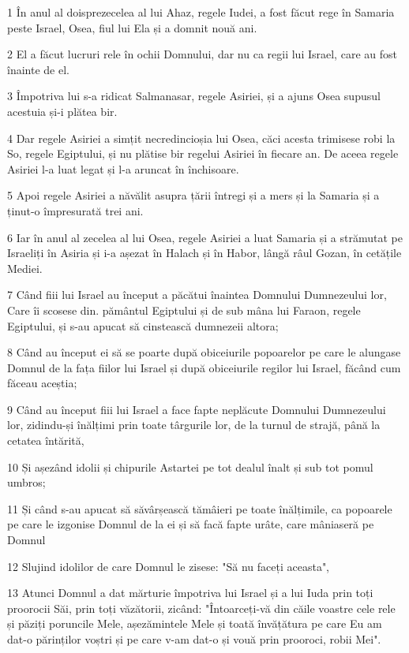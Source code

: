 \par 1 În anul al doisprezecelea al lui Ahaz, regele Iudei, a fost făcut rege în Samaria peste Israel, Osea, fiul lui Ela și a domnit nouă ani.
\par 2 El a făcut lucruri rele în ochii Domnului, dar nu ca regii lui Israel, care au fost înainte de el.
\par 3 Împotriva lui s-a ridicat Salmanasar, regele Asiriei, și a ajuns Osea supusul acestuia și-i plătea bir.
\par 4 Dar regele Asiriei a simțit necredincioșia lui Osea, căci acesta trimisese robi la So, regele Egiptului, și nu plătise bir regelui Asiriei în fiecare an. De aceea regele Asiriei l-a luat legat și l-a aruncat în închisoare.
\par 5 Apoi regele Asiriei a năvălit asupra țării întregi și a mers și la Samaria și a ținut-o împresurată trei ani.
\par 6 Iar în anul al zecelea al lui Osea, regele Asiriei a luat Samaria și a strămutat pe Israeliți în Asiria și i-a așezat în Halach și în Habor, lângă râul Gozan, în cetățile Mediei.
\par 7 Când fiii lui Israel au început a păcătui înaintea Domnului Dumnezeului lor, Care îi scosese din. pământul Egiptului și de sub mâna lui Faraon, regele Egiptului, și s-au apucat să cinstească dumnezeii altora;
\par 8 Când au început ei să se poarte după obiceiurile popoarelor pe care le alungase Domnul de la fața fiilor lui Israel și după obiceiurile regilor lui Israel, făcând cum făceau aceștia;
\par 9 Când au început fiii lui Israel a face fapte neplăcute Domnului Dumnezeului lor, zidindu-și înălțimi prin toate târgurile lor, de la turnul de strajă, până la cetatea întărită,
\par 10 Și așezând idolii și chipurile Astartei pe tot dealul înalt și sub tot pomul umbros;
\par 11 Și când s-au apucat să săvârșească tămâieri pe toate înălțimile, ca popoarele pe care le izgonise Domnul de la ei și să facă fapte urâte, care mâniaseră pe Domnul
\par 12 Slujind idolilor de care Domnul le zisese: "Să nu faceți aceasta",
\par 13 Atunci Domnul a dat mărturie împotriva lui Israel și a lui Iuda prin toți proorocii Săi, prin toți văzătorii, zicând: "Întoarceți-vă din căile voastre cele rele și păziți poruncile Mele, așezămintele Mele și toată învățătura pe care Eu am dat-o părinților voștri și pe care v-am dat-o și vouă prin prooroci, robii Mei".
